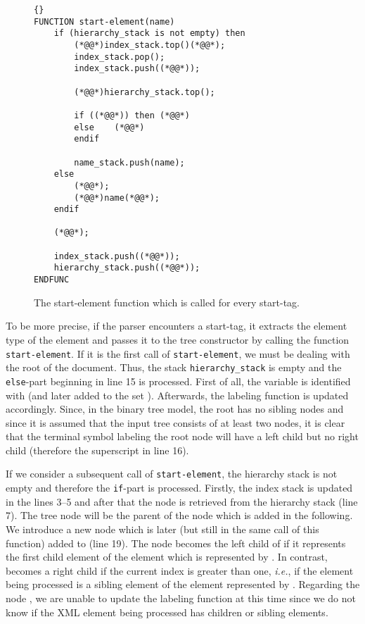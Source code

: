 \documentclass[12pt]{llncs}
\newcommand{\hairsp}{\hspace{1pt}}\newcommand{\TODO}{\textcolor{red}{\bf TODO!}\xspace}
\newcommand{\ie}{\mbox{\textit{i.\hairsp{}e.}}\xspace}
\begin{document}
\begin{figure}[tb]
\begin{lstlisting}{}
FUNCTION start-element(name)
	if (hierarchy_stack is not empty) then
		(*@@*)index_stack.top()(*@@*);
		index_stack.pop();
		index_stack.push((*@@*));

		(*@@*)hierarchy_stack.top();
		
		if ((*@@*)) then (*@@*)
		else	(*@@*)
		endif
		
		name_stack.push(name);
	else
		(*@@*);
		(*@@*)name(*@@*);
	endif
	
	(*@@*);

	index_stack.push((*@@*));
	hierarchy_stack.push((*@@*));
ENDFUNC
\end{lstlisting}
\caption{The start-element function which is called for every start-tag.}\label{lst:functionStartElement}
\end{figure}

To be more precise, if the parser encounters a start-tag, it extracts the element type of the element and passes it to the tree constructor by calling the function \verb|start-element|. If it is the first call of \verb|start-element|, we must be dealing with the root of the document. Thus, the stack \verb|hierarchy_stack| is empty and the \verb|else|-part beginning in line 15 is processed. First of all, the variable  is identified with  (and later added to the set ). Afterwards, the labeling function  is updated accordingly. Since, in the binary tree model, the root has no sibling nodes and since it is assumed that the input tree consists of at least two nodes, it is clear that the terminal symbol labeling the root node will have a left child but no right child (therefore the superscript  in line 16).

If we consider a subsequent call of \verb|start-element|, the hierarchy stack is not empty and therefore the \verb|if|-part is processed. Firstly, the index stack is updated in the lines 3--5 and after that the node  is retrieved from the hierarchy stack (line 7). The tree node  will be the parent of the node which is added in the following. We introduce a new node  which is later (but still in the same call of this function) added to  (line 19). The node  becomes the left child of  if it represents the first child element of the element which is represented by . In contrast,  becomes a right child if the current index  is greater than one, \ie, if the element being processed is a sibling element of the element represented by . Regarding the node , we are unable to update the labeling function  at this time since we do not know if the XML element being processed has children or sibling elements. 
\end{document}
